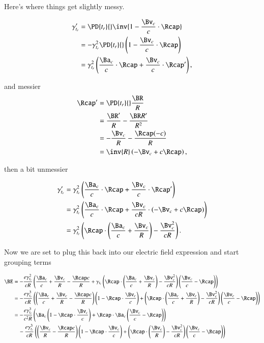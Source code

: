 Here's where things get slightly messy.

\begin{align*}
\gamma_{t_r}' 
&= \PD{t_r}{} \inv{1 - \frac{\Bv_c}{c} \cdot \Rcap } \\
&= -\gamma_{t_r}^2 \PD{t_r}{} \left( 1 - \frac{\Bv_c}{c} \cdot \Rcap \right) \\
&= \gamma_{t_r}^2 \left( \frac{\Ba_c}{c} \cdot \Rcap + \frac{\Bv_c}{c} \cdot \Rcap' \right),
\end{align*}

and messier
\begin{align*}
\Rcap' 
&= \PD{t_r}{} \frac{ \BR }{ R } \\
&= \frac{ \BR' }{ R } - \frac{\BR R'}{R^2} \\
&= -\frac{ \Bv_c }{ R } - \frac{\Rcap (-c)}{R} \\
&= \inv{R} \left( -\Bv_c + c \Rcap \right),
\end{align*}

then a bit unmessier

\begin{align*}
\gamma_{t_r}'
&= \gamma_{t_r}^2 \left( \frac{\Ba_c}{c} \cdot \Rcap + \frac{\Bv_c}{c} \cdot \Rcap' \right) \\
&= \gamma_{t_r}^2 \left( \frac{\Ba_c}{c} \cdot \Rcap + \frac{\Bv_c}{c R} \cdot (-\Bv_c + c \Rcap) \right) \\
&= \gamma_{t_r}^2 \left( \Rcap \cdot \left( \frac{\Ba_c}{c} + \frac{\Bv_c}{R} \right) - \frac{\Bv_c^2}{c R} \right).
\end{align*}

Now we are set to plug this back into our electric field expression and start grouping terms

\begin{align*}
\BE
&= - \frac{e \gamma_{t_r}^2}{c R} \left( 
\frac{\Ba_c}{c} 
+\frac{\Bv_c}{R} 
- \frac{\Rcap c}{R}
+ \gamma_{t_r} \left( \Rcap \cdot \left( \frac{\Ba_c}{c} + \frac{\Bv_c}{R} \right) - \frac{\Bv_c^2}{c R} \right)
\left( \frac{\Bv_c}{c} - \Rcap \right)
\right) \\
&= - \frac{e \gamma_{t_r}^3}{c R} \left( 
\left(
\frac{\Ba_c}{c} 
+\frac{\Bv_c}{R} 
- \frac{\Rcap c}{R}
\right) \left(
1 -\Rcap \cdot \frac{\Bv_c}{c} 
\right)
+ \left( \Rcap \cdot \left( \frac{\Ba_c}{c} + \frac{\Bv_c}{R} \right) - \frac{\Bv_c^2}{c R} \right)
\left( \frac{\Bv_c}{c} - \Rcap \right)
\right) \\
&= 
- \frac{e \gamma_{t_r}^3}{c^2 R} \left( 
\Ba_c
\left(
1 -\Rcap \cdot \frac{\Bv_c}{c} 
\right)
+\Rcap \cdot \Ba_c \left( \frac{\Bv_c}{c} - \Rcap \right)
\right) \\
&\quad - \frac{e \gamma_{t_r}^3}{c R} \left( 
\left(
\frac{\Bv_c}{R} 
- \frac{\Rcap c}{R}
\right) 
\left(
1 -\Rcap \cdot \frac{\Bv_c}{c} 
\right)
+ \left( \Rcap \cdot \left( \frac{\Bv_c}{R} \right) - \frac{\Bv_c^2}{c R} \right)
\left( \frac{\Bv_c}{c} - \Rcap \right)
\right) \\
\end{align*}

